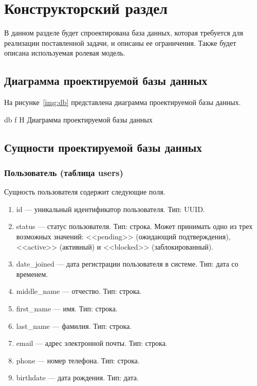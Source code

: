 \chapter{Конструкторский раздел}

В данном разделе будет спроектирована база данных, которая требуется для реализации поставленной задачи, и описаны ее ограничения. Также будет описана используемая ролевая модель.

\section{Диаграмма проектируемой базы данных}

На рисунке~\ref{img:db} представлена диаграмма проектируемой базы данных.

    {db}
    {f}
    {H}
    {\textwidth}
    {Диаграмма проектируемой базы данных}

\section{Сущности проектируемой базы данных}

\subsection{Пользователь (таблица users)}

Сущность пользователя содержит следующие поля.

\begin{enumerate}
    \item id --- уникальный идентификатор пользователя. Тип: UUID.
    \item status --- статус пользователя. Тип: строка. Может принимать одно из трех возможных значений: <<pending>> (ожидающий подтверждения), <<active>> (активный) и <<blocked>> (заблокированный).
    \item date\_joined --- дата регистрации пользователя в системе. Тип: дата со временем.
    \item middle\_name --- отчество. Тип: строка.
    \item first\_name --- имя. Тип: строка.
    \item last\_name --- фамилия. Тип: строка.
    \item email --- адрес электронной почты. Тип: строка.
    \item phone --- номер телефона. Тип: строка.
    \item birthdate --- дата рождения. Тип: дата.
\end{enumerate}

